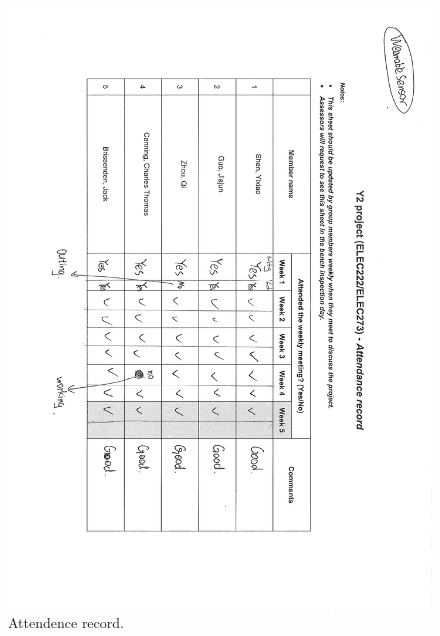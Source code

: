 \documentclass[12pt, a4paper]{report}
\begin{document}
\begin{figure}[htbp]
	\centering
	\includegraphics[width=\textwidth]{
		appendix/attendence-record}
	\caption{Attendence record.}
	\label{fig:attendence-record}
\end{figure}
\end{document}
